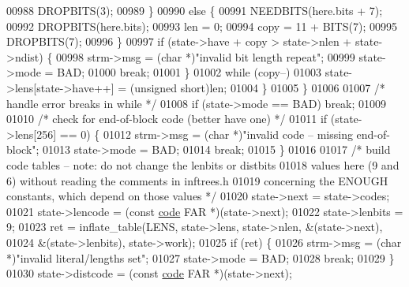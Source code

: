 \begin{DoxyCode}
{{{{{{{{00988                         DROPBITS(3);
00989                     \}
00990                     \textcolor{keywordflow}{else} \{
00991                         NEEDBITS(here.bits + 7);
00992                         DROPBITS(here.bits);
00993                         len = 0;
00994                         copy = 11 + BITS(7);
00995                         DROPBITS(7);
00996                     \}
00997                     \textcolor{keywordflow}{if} (state->have + copy > state->nlen + state->ndist) \{
00998                         strm->msg = (\textcolor{keywordtype}{char} *)\textcolor{stringliteral}{"invalid bit length repeat"};
00999                         state->mode = BAD;
01000                         \textcolor{keywordflow}{break};
01001                     \}
01002                     \textcolor{keywordflow}{while} (copy--)
01003                         state->lens[state->have++] = (\textcolor{keywordtype}{unsigned} short)len;
01004                 \}
01005             \}
01006 
01007             \textcolor{comment}{/* handle error breaks in while */}
01008             \textcolor{keywordflow}{if} (state->mode == BAD) \textcolor{keywordflow}{break};
01009 
01010             \textcolor{comment}{/* check for end-of-block code (better have one) */}
01011             \textcolor{keywordflow}{if} (state->lens[256] == 0) \{
01012                 strm->msg = (\textcolor{keywordtype}{char} *)\textcolor{stringliteral}{"invalid code -- missing end-of-block"};
01013                 state->mode = BAD;
01014                 \textcolor{keywordflow}{break};
01015             \}
01016 
01017             \textcolor{comment}{/* build code tables -- note: do not change the lenbits or distbits}
01018 \textcolor{comment}{               values here (9 and 6) without reading the comments in inftrees.h}
01019 \textcolor{comment}{               concerning the ENOUGH constants, which depend on those values */}
01020             state->next = state->codes;
01021             state->lencode = (\textcolor{keyword}{const} \hyperlink{structcode}{code} FAR *)(state->next);
01022             state->lenbits = 9;
01023             ret = inflate\_table(LENS, state->lens, state->nlen, &(state->next),
01024                                 &(state->lenbits), state->work);
01025             \textcolor{keywordflow}{if} (ret) \{
01026                 strm->msg = (\textcolor{keywordtype}{char} *)\textcolor{stringliteral}{"invalid literal/lengths set"};
01027                 state->mode = BAD;
01028                 \textcolor{keywordflow}{break};
01029             \}
01030             state->distcode = (\textcolor{keyword}{const} \hyperlink{structcode}{code} FAR *)(state->next);
}}}}}}}}
\end{DoxyCode}
